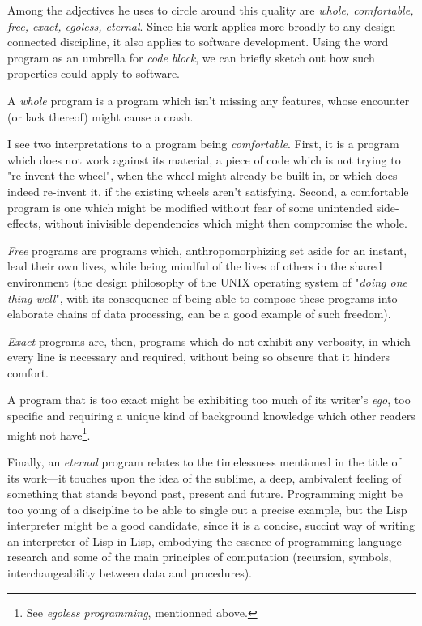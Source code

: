 \documentclass{article}
\begin{document}
Among the adjectives he uses to circle around this quality are \emph{whole, comfortable, free, exact, egoless, eternal}. Since his work applies more broadly to any design-connected discipline, it also applies to software development. Using the word program as an umbrella for \emph{code block}, we can briefly sketch out how such properties could apply to software.

A \emph{whole} program is a program which isn't missing any features, whose encounter (or lack thereof) might cause a crash.

I see two interpretations to a program being \emph{comfortable}. First, it is a program which does not work against its material, a piece of code which is not trying to "re-invent the wheel", when the wheel might already be built-in, or which does indeed re-invent it, if the existing wheels aren't satisfying. Second, a comfortable program is one which might be modified without fear of some unintended side-effects, without inivisible dependencies which might then compromise the whole.

\emph{Free} programs are programs which, anthropomorphizing set aside for an instant, lead their own lives, while being mindful of the lives of others in the shared environment (the design philosophy of the UNIX operating system of "\emph{doing one thing well}", with its consequence of being able to compose these programs into elaborate chains of data processing, can be a good example of such freedom).

\emph{Exact} programs are, then, programs which do not exhibit any verbosity, in which every line is necessary and required, without being so obscure that it hinders comfort.

A program that is too exact might be exhibiting too much of its writer's \emph{ego}, too specific and requiring a unique kind of background knowledge which other readers might not have\footnote{See \emph{egoless programming}, mentionned above.}.

Finally, an \emph{eternal} program relates to the timelessness mentioned in the title of its work—it touches upon the idea of the sublime, a deep, ambivalent feeling of something that stands beyond past, present and future. Programming might be too young of a discipline to be able to single out a precise example, but the Lisp interpreter might be a good candidate, since it is a concise, succint way of writing an interpreter of Lisp in Lisp, embodying the essence of programming language research and some of the main principles of computation (recursion, symbols, interchangeability between data and procedures).
\end{document}
